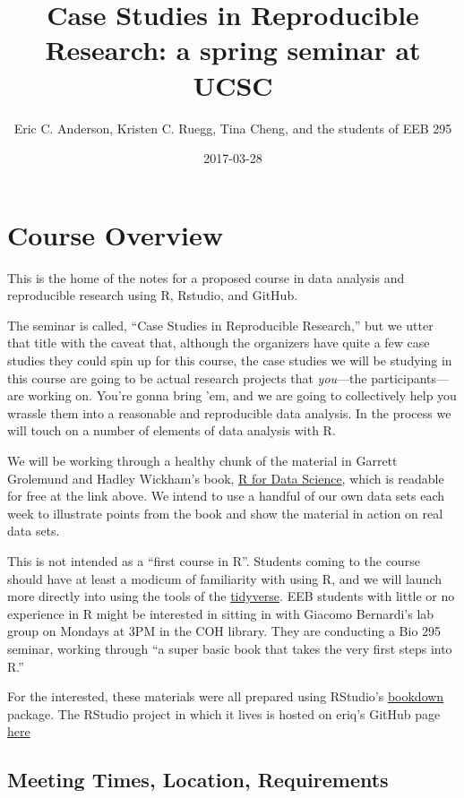 \documentclass[]{book}
\title{Case Studies in Reproducible Research: a spring seminar at UCSC}
\author{Eric C. Anderson, Kristen C. Ruegg, Tina Cheng, and the students of EEB
295}
\date{2017-03-28}
\theoremstyle{definition}
\theoremstyle{definition}
\theoremstyle{remark}
\begin{document}
\maketitle

{
\setcounter{tocdepth}{1}
\tableofcontents
}
\chapter{Course Overview}\label{course-overview}

This is the home of the notes for a proposed course in data analysis and
reproducible research using R, Rstudio, and GitHub.

The seminar is called, ``Case Studies in Reproducible Research,'' but we
utter that title with the caveat that, although the organizers have
quite a few case studies they could spin up for this course, the case
studies we will be studying in this course are going to be actual
research projects that \emph{you}---the participants---are working on.
You're gonna bring 'em, and we are going to collectively help you
wrassle them into a reasonable and reproducible data analysis. In the
process we will touch on a number of elements of data analysis with R.

We will be working through a healthy chunk of the material in Garrett
Grolemund and Hadley Wickham's book, \href{http://r4ds.had.co.nz/}{R for
Data Science}, which is readable for free at the link above. We intend
to use a handful of our own data sets each week to illustrate points
from the book and show the material in action on real data sets.

This is not intended as a ``first course in R''. Students coming to the
course should have at least a modicum of familiarity with using R, and
we will launch more directly into using the tools of the
\href{http://tidyverse.org/}{tidyverse}. EEB students with little or no
experience in R might be interested in sitting in with Giacomo
Bernardi's lab group on Mondays at 3PM in the COH library. They are
conducting a Bio 295 seminar, working through ``a super basic book that
takes the very first steps into R.''

For the interested, these materials were all prepared using RStudio's
\href{https://bookdown.org/}{bookdown} package. The RStudio project in
which it lives is hosted on eriq's GitHub page
\href{https://github.com/eriqande/rep-res-eeb-2017}{here}

\section{Meeting Times, Location,
Requirements}\label{meeting-times-location-requirements}
\end{document}
